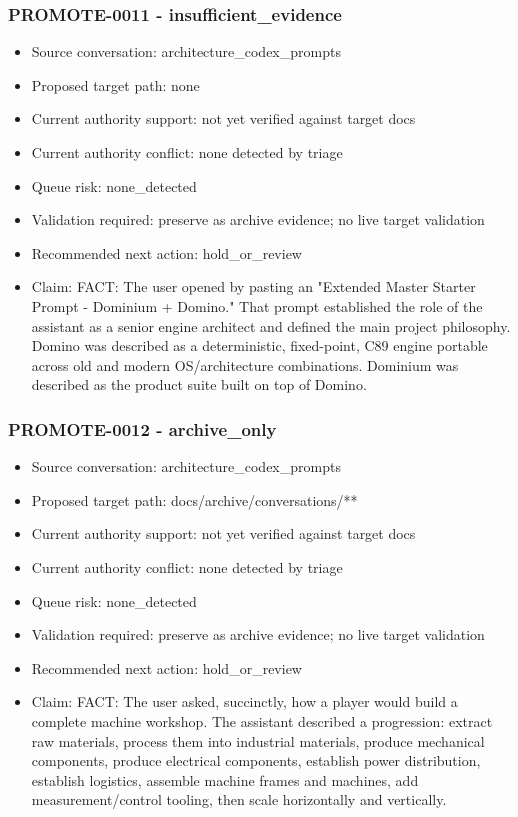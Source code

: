 \documentclass[11pt,a4paper]{report}
\begin{document}
\subsubsection{PROMOTE-0011 - insufficient\_evidence}

\begin{itemize}
\item Source conversation: architecture\_codex\_prompts
\item Proposed target path: none
\item Current authority support: not yet verified against target docs
\item Current authority conflict: none detected by triage
\item Queue risk: none\_detected
\item Validation required: preserve as archive evidence; no live target validation
\item Recommended next action: hold\_or\_review
\item Claim: FACT: The user opened by pasting an "Extended Master Starter Prompt - Dominium + Domino." That prompt established the role of the assistant as a senior engine architect and defined the main project philosophy. Domino was described as a deterministic, fixed-point, C89 engine portable across old and modern OS/architecture combinations. Dominium was described as the product suite built on top of Domino.
\end{itemize}

\subsubsection{PROMOTE-0012 - archive\_only}

\begin{itemize}
\item Source conversation: architecture\_codex\_prompts
\item Proposed target path: docs/archive/conversations/**
\item Current authority support: not yet verified against target docs
\item Current authority conflict: none detected by triage
\item Queue risk: none\_detected
\item Validation required: preserve as archive evidence; no live target validation
\item Recommended next action: hold\_or\_review
\item Claim: FACT: The user asked, succinctly, how a player would build a complete machine workshop. The assistant described a progression: extract raw materials, process them into industrial materials, produce mechanical components, produce electrical components, establish power distribution, establish logistics, assemble machine frames and machines, add measurement/control tooling, then scale horizontally and vertically.
\end{itemize}
\end{document}
